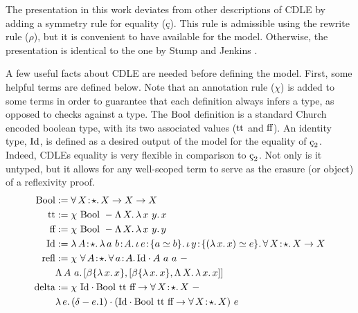 The presentation in this work deviates from other descriptions of CDLE by adding a symmetry rule for equality (\c{c}).
This rule is admissible using the rewrite rule ($\rho$), but it is convenient to have available for the model.
Otherwise, the presentation is identical to the one by Stump and Jenkins \cite{stump2021_cedillecore}.




A few useful facts about CDLE are needed before defining the model.
First, some helpful terms are defined below.
Note that an annotation rule ($\chi$) is added to some terms in order to guarantee that each definition always infers a type, as opposed to checks against a type.
The $\textnormal{Bool}$ definition is a standard Church encoded boolean type, with its two associated values ($\textnormal{tt}$ and $\textnormal{ff}$).
An identity type, $\textnormal{Id}$, is defined as a desired output of the model for the equality of $\ced$.
Indeed, CDLEs equality is very flexible in comparison to $\ced$.
Not only is it untyped, but it allows for any well-scoped term to serve as the erasure (or object) of a reflexivity proof.
\begin{align*}
    \cBool &:= \abs{\forall}{X}{\star}{X \to X \to X} \\
    \ctt &:= \chi\ \cBool\ - \absu{\Lambda}{X}{
        \absu{\lambda}{x\ y}{x}
    } \\
    \cff &:= \chi\ \cBool\ - \absu{\Lambda}{X}{
        \absu{\lambda}{x\ y}{y}
    } \\
    \cId &:= \abs{\lambda}{A}{\star}{
        \abs{\lambda}{a\ b}{A}{
            \abs{\iota}{e}{\{ a \simeq b \}}{
                \abs{\iota}{y}{\{ (\absu{\lambda}{x}{x}) \simeq e \}}{
                    \abs{\forall}{X}{\star}{
                        X \to X
                    }
                }
            }
        }
    } \\
    \crefl &:= \chi\ \abs{\forall}{A}{\star}{
            \abs{\forall}{a}{A}{
                \cId \cdot A\ a\ a
            }
        }\ -
        \\ &\absu{\Lambda}{A\ a}{
        [\beta\{ \absu{\lambda}{x}{x} \}, [\beta\{ \absu{\lambda}{x}{x} \}, \absu{\Lambda}{X}{\absu{\lambda}{x}{x}}]]
    } \\
    \cdelta &:= \chi\ \cId \cdot \cBool\ \ctt\ \cff \to \abs{\forall}{X}{\star}{X}\ -
        \\ &\absu{\lambda}{e}{
        (\delta - e.1) \cdot (\cId \cdot \cBool\ \ctt\ \cff \to \abs{\forall}{X}{\star}{X})\ e
    }
\end{align*}
